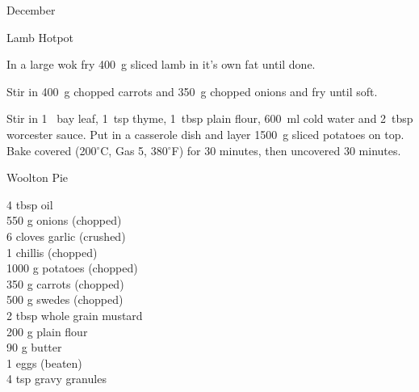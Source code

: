 \begin{menu}{December}
\begin{recipe}{2}{Lamb Hotpot}
\begin{ingredients}
		\end{ingredients}
	
	
    \begin{instructions}
    \item 
        In a large wok fry
        400~g sliced lamb
        in it's own fat until done.
      \item 
        Stir in
        400~g chopped carrots
        and
        350~g chopped onions
        and fry until soft.
      \item 
        Stir in
        1~  bay leaf,
        1~tsp  thyme,
        1~tbsp  plain flour,
        600~ml  cold water
        and
        2~tbsp  worcester sauce.
        Put in a casserole dish and
        layer 1500~g sliced potatoes on top.
        Bake covered (200$^{\circ}$C, Gas 5, 380$^{\circ}$F)
        for 30 minutes,
        then uncovered 30 minutes.
      
    \end{instructions}
    \end{recipe}%
  
    \begin{recipe}{2}{Woolton Pie}%
		\begin{ingredients}
		4 tbsp oil  \\
	550 g onions (chopped) \\
	6 cloves garlic (crushed) \\
	1  chillis (chopped) \\
	1000 g potatoes (chopped) \\
	350 g carrots (chopped) \\
	500 g swedes (chopped) \\
	2 tbsp whole grain mustard  \\
	200 g plain flour  \\
	90 g butter  \\
	1  eggs (beaten) \\
	4 tsp gravy granules  \\
	
		\end{ingredients}
	
	

\end{recipe}
\end{menu}

